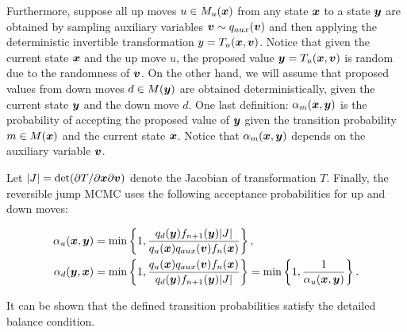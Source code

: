 Furthermore, suppose all up moves $u \in M_u(\mbox{\boldmath $x$})$ from any state $\mbox{\boldmath $x$}$ to a state $\mbox{\boldmath $y$}$ are obtained by sampling auxiliary variables $\mbox{\boldmath $v$} \sim q_{aux}(\mbox{\boldmath $v$})$ and then applying the deterministic invertible transformation $y=T_u(\mbox{\boldmath $x$}, \mbox{\boldmath $v$})$. Notice that given the current state $\mbox{\boldmath $x$}$ and the up move $u$, the proposed value $\mbox{\boldmath $y$} = T_u(\mbox{\boldmath $x$}, \mbox{\boldmath $v$})$ is random due to the randomness of $\mbox{\boldmath $v$}$. On the other hand, we will assume that proposed values from down moves $d\in M(\mbox{\boldmath $y$})$ are obtained deterministically, given the current state $\mbox{\boldmath $y$}$ and the down move $d$. One last definition: $\alpha_m(\mbox{\boldmath $x$},\mbox{\boldmath $y$})$ is the probability of accepting the proposed value of $\mbox{\boldmath $y$}$ given the transition probability $m \in M(\mbox{\boldmath $x$})$ and the current state $\mbox{\boldmath $x$}$. Notice that $\alpha_m(\mbox{\boldmath $x$},\mbox{\boldmath $y$})$ depends on the auxiliary variable $\mbox{\boldmath $v$}$.

Let $|J|=\det(\partial T/\partial \mbox{\boldmath $x$} \partial \mbox{\boldmath $v$})$ denote the Jacobian of transformation $T$. Finally, the reversible jump MCMC uses the following acceptance probabilities for up and down moves:

\begin{align*}
\alpha_u(\mbox{\boldmath $x$}, \mbox{\boldmath $y$}) &= \min \left\{ 1, \frac{q_d(\mbox{\boldmath $y$})f_{n+1}(\mbox{\boldmath $y$}) |J|}{  q_u(\mbox{\boldmath $x$}) q_{aux}(\mbox{\boldmath $v$})f_{n}(\mbox{\boldmath $x$}) } \right\},\\
\alpha_d(\mbox{\boldmath $y$}, \mbox{\boldmath $x$}) &= \min\left\{ 1, \frac{  q_u(\mbox{\boldmath $x$}) q_{aux}(\mbox{\boldmath $v$})f_{n}(\mbox{\boldmath $x$}) }{q_d(\mbox{\boldmath $y$})f_{n+1}(\mbox{\boldmath $y$}) |J|} \right\}=\min\left\{ 1, \frac{1}{\alpha_u(\mbox{\boldmath $x$}, \mbox{\boldmath $y$})} \right\}.
\end{align*}

\noindent It can be shown that the defined transition probabilities satisfy the detailed balance condition.
